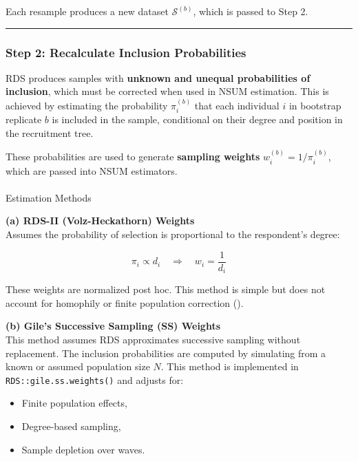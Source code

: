 \documentclass[
  12pt,
  letterpaper,
  DIV=11,
  numbers=noendperiod]{scrartcl}
\makeatletter
\let\oldparagraph\paragraph
\renewcommand{\paragraph}{
    \@ifstar
      \xxxParagraphStar
      \xxxParagraphNoStar
  }
\newcommand{\xxxParagraphStar}[1]{\oldparagraph*{#1}\mbox{}}
\newcommand{\xxxParagraphNoStar}[1]{\oldparagraph{#1}\mbox{}}
\theoremstyle{plain}
\theoremstyle{definition}
\makeatother
\begin{document}
Each resample produces a new dataset \(\mathcal{S}^{(b)}\), which is
passed to Step 2.

\begin{center}\rule{0.5\linewidth}{0.5pt}\end{center}

\subsubsection{Step 2: Recalculate Inclusion
Probabilities}\label{step-2-recalculate-inclusion-probabilities}

RDS produces samples with \textbf{unknown and unequal probabilities of
inclusion}, which must be corrected when used in NSUM estimation. This
is achieved by estimating the probability \(\pi_i^{(b)}\) that each
individual \(i\) in bootstrap replicate \(b\) is included in the sample,
conditional on their degree and position in the recruitment tree.

These probabilities are used to generate \textbf{sampling weights}
\(w_i^{(b)} = 1/\pi_i^{(b)}\), which are passed into NSUM estimators.

\paragraph{Estimation Methods}\label{estimation-methods-1}

\textbf{(a) RDS-II (Volz-Heckathorn) Weights}\\
Assumes the probability of selection is proportional to the respondent's
degree:

\[\pi_i \propto d_i \quad \Rightarrow \quad w_i = \frac{1}{d_i}\]

These weights are normalized post hoc. This method is simple but does
not account for homophily or finite population correction
(\textcite{volz08-rds}).

\textbf{(b) Gile's Successive Sampling (SS) Weights}\\
This method assumes RDS approximates successive sampling without
replacement. The inclusion probabilities are computed by simulating from
a known or assumed population size \(N\). This method is implemented in
\texttt{RDS::gile.ss.weights()} and adjusts for:

\begin{itemize}
\item
  Finite population effects,
\item
  Degree-based sampling,
\item
  Sample depletion over waves.
\end{itemize}
\end{document}
